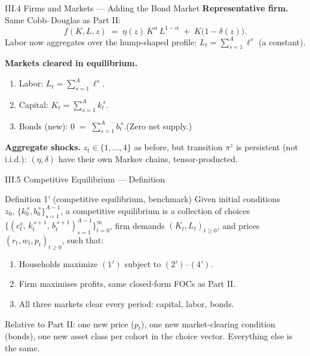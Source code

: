 \documentclass[aspectratio=169,11pt]{beamer}
\newcommand{\emphc}[1]{\textcolor{harvardcrimson}{#1}}
\begin{document}
\begin{frame}{III.4 Firms and Markets --- Adding the Bond Market}
\small
\textbf{Representative firm.}  Same Cobb--Douglas as Part II:
\[
f(K, L, z) \;=\; \eta(z)\, K^{\alpha}\, L^{1-\alpha} \;+\; K\bigl(1-\delta(z)\bigr).
\]
Labor now aggregates over the hump-shaped profile: $L_t = \sum_{s=1}^{A} \ell^s$ (a constant).

\vspace{0.5em}
\textbf{Markets cleared in equilibrium.}
\begin{enumerate}\itemsep2pt
    \item Labor: $L_t = \sum_{s=1}^{A} \ell^s$.
    \item Capital: $K_t = \sum_{s=1}^{A} k_t^{\,s}$.
    \item \emphc{Bonds (new): $\displaystyle 0 \;=\; \sum_{s=1}^{A} b_t^{\,s}.$}\quad (Zero net supply.)
\end{enumerate}

\vspace{0.3em}
\textbf{Aggregate shocks.}  $z_t \in \{1,\ldots,4\}$ as before, but transition $\pi^z$ is \emphc{persistent} (not i.i.d.): $(\eta, \delta)$ have their own Markov chains, tensor-producted.
\end{frame}


\begin{frame}{III.5 Competitive Equilibrium --- Definition}
\small
\begin{block}{Definition 1' (competitive equilibrium, benchmark)}
Given initial conditions $z_0,\, \{k_0^{\,s}, b_0^{\,s}\}_{s=1}^{A-1}$, a competitive equilibrium is
a collection of choices $\bigl\{(c_t^s,\,k_t^{\,s+1},\,b_t^{\,s+1})_{s=1}^{A-1}\bigr\}_{t=0}^\infty$,
firm demands $(K_t, L_t)_{t \ge 0}$, and prices $(r_t, w_t, p_t)_{t\ge 0}$, such that:
\begin{enumerate}\itemsep1pt
    \item Households maximize $(1')$ subject to $(2')$--$(4')$.
    \item Firm maximises profits, same closed-form FOCs as Part II.
    \item \emphc{All three markets clear} every period: capital, labor, \emphc{bonds}.
\end{enumerate}
\end{block}

\vspace{0.3em}
{\footnotesize Relative to Part II: one new price ($p_t$), one new market-clearing condition (bonds), one new asset class per cohort in the choice vector.  Everything else is the same.}
\end{frame}
\end{document}
